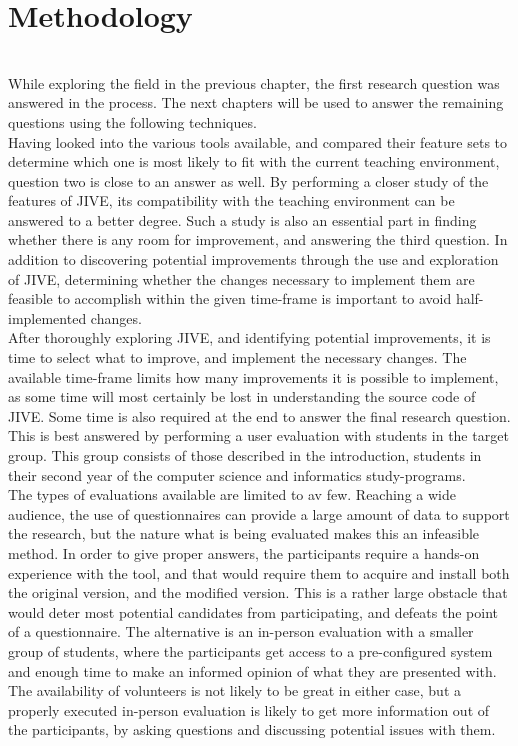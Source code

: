 \chapter{Methodology}\label{methodology}
~\\
While exploring the field in the previous chapter, the first research question was answered in the process.
The next chapters will be used to answer the remaining questions using the following techniques.
~\\

Having looked into the various tools available, and compared their feature sets to determine which one is most likely to fit with the current teaching environment, question two is close to an answer as well.
By performing a closer study of the features of JIVE, its compatibility with the teaching environment can be answered to a better degree.
Such a study is also an essential part in finding whether there is any room for improvement, and answering the third question.
In addition to discovering potential improvements through the use and exploration of JIVE, determining whether the changes necessary to implement them are feasible to accomplish within the given time-frame is important to avoid half-implemented changes.
~\\

After thoroughly exploring JIVE, and identifying potential improvements, it is time to select what to improve, and implement the necessary changes.
The available time-frame limits how many improvements it is possible to implement, as some time will most certainly be lost in understanding the source code of JIVE.
Some time is also required at the end to answer the final research question.
This is best answered by performing a user evaluation with students in the target group.
This group consists of those described in the introduction, students in their second year of the computer science and informatics study-programs.
~\\

The types of evaluations available are limited to av few.
Reaching a wide audience, the use of questionnaires can provide a large amount of data to support the research, but the nature what is being evaluated makes this an infeasible method.
In order to give proper answers, the participants require a hands-on experience with the tool, and that would require them to acquire and install both the original version, and the modified version.
This is a rather large obstacle that would deter most potential candidates from participating, and defeats the point of a questionnaire.
The alternative is an in-person evaluation with a smaller group of students, where the participants get access to a pre-configured system and enough time to make an informed opinion of what they are presented with.
The availability of volunteers is not likely to be great in either case, but a properly executed in-person evaluation is likely to get more information out of the participants, by asking questions and discussing potential issues with them.